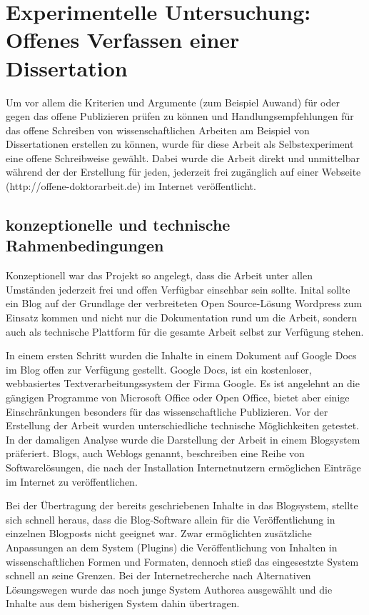 \chapter{Experimentelle Untersuchung: Offenes Verfassen einer Dissertation}

Um vor allem die Kriterien und Argumente (zum Beispiel Auwand) für oder gegen das offene Publizieren prüfen zu können und Handlungsempfehlungen für das offene Schreiben von wissenschaftlichen Arbeiten am Beispiel von Dissertationen erstellen zu können, wurde für diese Arbeit als Selbstexperiment eine offene Schreibweise gewählt. Dabei wurde die Arbeit direkt und unmittelbar während der der Erstellung für jeden, jederzeit frei zugänglich auf einer Webseite (http://offene-doktorarbeit.de) im Internet veröffentlicht.

\section{konzeptionelle und technische Rahmenbedingungen}

Konzeptionell war das Projekt so angelegt, dass die Arbeit unter allen Umständen jederzeit frei und offen Verfügbar einsehbar sein sollte. Inital sollte ein Blog auf der Grundlage der verbreiteten Open Source-Lösung Wordpress zum Einsatz kommen und nicht nur die Dokumentation rund um die Arbeit, sondern auch als technische Plattform für die gesamte Arbeit selbst zur Verfügung stehen.

In einem ersten Schritt wurden die Inhalte in einem Dokument auf Google Docs im Blog offen zur Verfügung gestellt. Google Docs, ist ein kostenloser, webbasiertes Textverarbeitungssystem der Firma Google. Es ist angelehnt an die gängigen Programme von Microsoft Office oder Open Office, bietet aber einige Einschränkungen besonders für das wissenschaftliche Publizieren. Vor der Erstellung der Arbeit wurden unterschiedliche technische Möglichkeiten getestet. In der damaligen Analyse wurde die Darstellung der Arbeit in einem Blogsystem präferiert. Blogs, auch Weblogs genannt, beschreiben eine Reihe von Softwarelösungen, die nach der Installation Internetnutzern ermöglichen Einträge im Internet zu veröffentlichen.

Bei der Übertragung der bereits geschriebenen Inhalte in das Blogsystem, stellte sich schnell heraus, dass die Blog-Software allein für die Veröffentlichung in einzelnen Blogposts nicht geeignet war. Zwar ermöglichten zusätzliche Anpassungen an dem System (Plugins) die Veröffentlichung von Inhalten in wissenschaftlichen Formen und Formaten, dennoch stieß das eingesestzte System schnell an seine Grenzen. Bei der Internetrecherche nach Alternativen Lösungswegen wurde das noch junge System Authorea ausgewählt und die Inhalte aus dem bisherigen System dahin übertragen.

